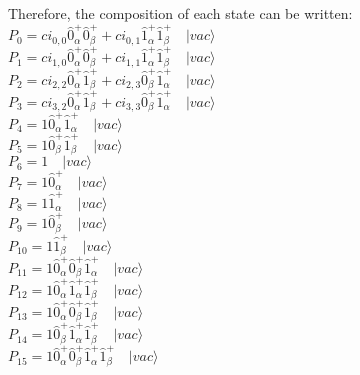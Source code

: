 \documentclass[14pt]{article}
\begin{document}
    Therefore, the composition of each state can be written: \\ 
    ${P}_{0} = {{ci}_{0,0}\hat{0}_{\alpha}^{+}\hat{0}_{\beta}^{+}}+{{ci}_{0,1}\hat{1}_{\alpha}^{+}\hat{1}_{\beta}^{+}} \quad \vert{vac}\rangle $ \\ 
    ${P}_{1} = {{ci}_{1,0}\hat{0}_{\alpha}^{+}\hat{0}_{\beta}^{+}}+{{ci}_{1,1}\hat{1}_{\alpha}^{+}\hat{1}_{\beta}^{+}} \quad \vert{vac}\rangle $ \\ 
    ${P}_{2} = {{ci}_{2,2}\hat{0}_{\alpha}^{+}\hat{1}_{\beta}^{+}}+{{ci}_{2,3}\hat{0}_{\beta}^{+}\hat{1}_{\alpha}^{+}} \quad \vert{vac}\rangle $ \\ 
    ${P}_{3} = {{ci}_{3,2}\hat{0}_{\alpha}^{+}\hat{1}_{\beta}^{+}}+{{ci}_{3,3}\hat{0}_{\beta}^{+}\hat{1}_{\alpha}^{+}} \quad \vert{vac}\rangle $ \\ 
    ${P}_{4} = {1\hat{0}_{\alpha}^{+}\hat{1}_{\alpha}^{+}} \quad \vert{vac}\rangle $ \\ 
    ${P}_{5} = {1\hat{0}_{\beta}^{+}\hat{1}_{\beta}^{+}} \quad \vert{vac}\rangle $ \\ 
    ${P}_{6} = {1} \quad \vert{vac}\rangle $ \\ 
    ${P}_{7} = {1\hat{0}_{\alpha}^{+}} \quad \vert{vac}\rangle $ \\ 
    ${P}_{8} = {1\hat{1}_{\alpha}^{+}} \quad \vert{vac}\rangle $ \\ 
    ${P}_{9} = {1\hat{0}_{\beta}^{+}} \quad \vert{vac}\rangle $ \\ 
    ${P}_{10} = {1\hat{1}_{\beta}^{+}} \quad \vert{vac}\rangle $ \\ 
    ${P}_{11} = {1\hat{0}_{\alpha}^{+}\hat{0}_{\beta}^{+}\hat{1}_{\alpha}^{+}} \quad \vert{vac}\rangle $ \\ 
    ${P}_{12} = {1\hat{0}_{\alpha}^{+}\hat{1}_{\alpha}^{+}\hat{1}_{\beta}^{+}} \quad \vert{vac}\rangle $ \\ 
    ${P}_{13} = {1\hat{0}_{\alpha}^{+}\hat{0}_{\beta}^{+}\hat{1}_{\beta}^{+}} \quad \vert{vac}\rangle $ \\ 
    ${P}_{14} = {1\hat{0}_{\beta}^{+}\hat{1}_{\alpha}^{+}\hat{1}_{\beta}^{+}} \quad \vert{vac}\rangle $ \\ 
    ${P}_{15} = {1\hat{0}_{\alpha}^{+}\hat{0}_{\beta}^{+}\hat{1}_{\alpha}^{+}\hat{1}_{\beta}^{+}} \quad \vert{vac}\rangle $ \\ 
    
\end{document}
